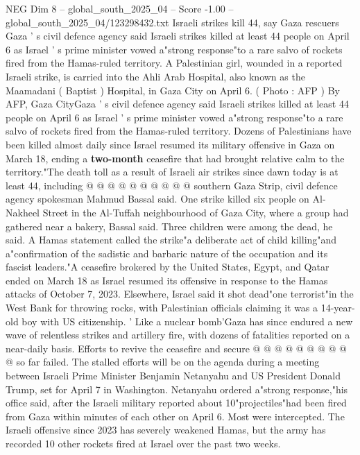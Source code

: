 \begin{textsample}{NEG Dim 8 – global\_south\_2025\_04 – Score -1.00 – global\_south\_2025\_04/123298432.txt}  \label{ex:f8_neg_049}
Israeli strikes kill 44, say Gaza rescuers Gaza ' s civil defence agency said Israeli strikes killed at least 44 people on April 6 as Israel ' s prime minister vowed a"strong response"to a rare salvo of rockets fired from the Hamas-ruled territory.
A Palestinian girl, wounded in a reported Israeli strike, is carried into the Ahli Arab Hospital, also known as the Maamadani ( Baptist ) Hospital, in Gaza City on April 6. ( Photo : AFP ) By AFP, Gaza CityGaza ' s civil defence agency said Israeli strikes killed at least 44 people on April 6 as Israel ' s prime minister vowed a"strong response"to a rare salvo of rockets fired from the Hamas-ruled territory.
Dozens of Palestinians have been killed almost daily since Israel resumed its military offensive in Gaza on March 18, ending a \textbf{two-month} ceasefire that had brought relative calm to the territory."The death toll as a result of Israeli air strikes since dawn today is at least 44, including @ @ @ @ @ @ @ @ @ @ southern Gaza Strip, civil defence agency spokesman Mahmud Bassal said.
One strike killed six people on Al-Nakheel Street in the Al-Tuffah neighbourhood of Gaza City, where a group had gathered near a bakery, Bassal said.
Three children were among the dead, he said.
A Hamas statement called the strike"a deliberate act of child killing"and a"confirmation of the sadistic and barbaric nature of the occupation and its fascist leaders."A ceasefire brokered by the United States, Egypt, and Qatar ended on March 18 as Israel resumed its offensive in response to the Hamas attacks of October 7, 2023.
Elsewhere, Israel said it shot dead"one terrorist"in the West Bank for throwing rocks, with Palestinian officials claiming it was a 14-year-old boy with US citizenship. ' Like a nuclear bomb'Gaza has since endured a new wave of relentless strikes and artillery fire, with dozens of fatalities reported on a near-daily basis.
Efforts to revive the ceasefire and secure @ @ @ @ @ @ @ @ @ @ so far failed.
The stalled efforts will be on the agenda during a meeting between Israeli Prime Minister Benjamin Netanyahu and US President Donald Trump, set for April 7 in Washington.
Netanyahu ordered a"strong response,"his office said, after the Israeli military reported about 10"projectiles"had been fired from Gaza within minutes of each other on April 6.
Most were intercepted.
The Israeli offensive since 2023 has severely weakened Hamas, but the army has recorded 10 other rockets fired at Israel over the past two weeks.

\end{textsample}
